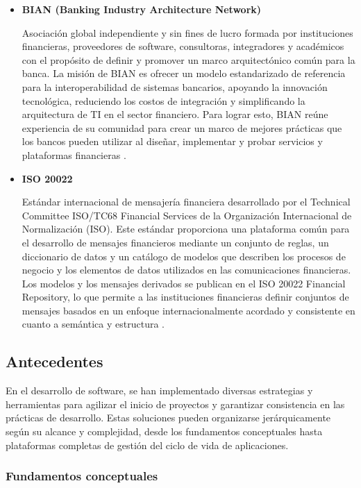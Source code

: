 \begin{itemize}
    \item \textbf{BIAN (Banking Industry Architecture Network)}  
    
    Asociación global independiente y sin fines de lucro formada por instituciones financieras, proveedores de software, consultoras, integradores y académicos con el propósito de definir y promover un marco arquitectónico común para la banca. La misión de BIAN es ofrecer un modelo estandarizado de referencia para la interoperabilidad de sistemas bancarios, apoyando la innovación tecnológica, reduciendo los costos de integración y simplificando la arquitectura de TI en el sector financiero. Para lograr esto, BIAN reúne experiencia de su comunidad para crear un marco de mejores prácticas que los bancos pueden utilizar al diseñar, implementar y probar servicios y plataformas financieras \citep{bian-2026}.
    
    \item \textbf{ISO 20022}  
    
    Estándar internacional de mensajería financiera desarrollado por el Technical Committee ISO/TC68 Financial Services de la Organización Internacional de Normalización (ISO). Este estándar proporciona una plataforma común para el desarrollo de mensajes financieros mediante un conjunto de reglas, un diccionario de datos y un catálogo de modelos que describen los procesos de negocio y los elementos de datos utilizados en las comunicaciones financieras. Los modelos y los mensajes derivados se publican en el ISO 20022 Financial Repository, lo que permite a las instituciones financieras definir conjuntos de mensajes basados en un enfoque internacionalmente acordado y consistente en cuanto a semántica y estructura \citep{iso20022-2026}.

\end{itemize}

\subsection{Antecedentes}

En el desarrollo de software, se han implementado diversas estrategias y herramientas para agilizar el inicio de proyectos y garantizar consistencia en las prácticas de desarrollo. Estas soluciones pueden organizarse jerárquicamente según su alcance y complejidad, desde los fundamentos conceptuales hasta plataformas completas de gestión del ciclo de vida de aplicaciones.


\subsubsection*{Fundamentos conceptuales}

